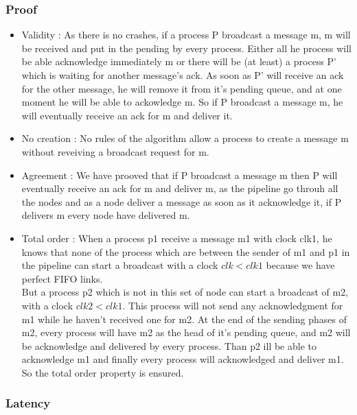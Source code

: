 \documentclass[a4paper]{article}
\begin{document}
\subsubsection{Proof}
\begin{itemize}
    \item Validity : As there  is no crashes, if a process P broadcast a
        message m, m will be received and put in the pending by every
        process. Either all he process will be able acknowledge immediately m 
        or there will be (at least) a process P' which is waiting for another message's ack.
        As soon as P' will receive an ack for the other message, he will remove it from it's
        pending queue, and at one moment he will be able to ackowledge m. 
        So if P broadcast a message m, he will eventually receive an ack
        for m and deliver it.
    \item No creation : No rules of the algorithm allow a process to
        create a message m without reveiving a broadcast request for m.
    \item Agreement : We have prooved that if P broadcast a message m
        then P will eventually receive an ack for m and deliver m, as
        the pipeline go throuh all the nodes and as a node deliver a
        message as soon as it acknowledge it, if P delivers m every node
        have delivered m.
    \item Total order : When a process p1 receive a message m1 with
        clock clk1, he knows
        that none of the process which are between the sender of m1 and p1
        in the pipeline can start a broadcast with a clock $clk<clk1$
        because we have perfect FIFO links.\\
        But a process p2 which is not in this set of node can start a
        broadcast of m2, with a clock $clk2<clk1$. This process will not send
        any acknowledgment for m1 while he haven't received one for m2.
        At the end of the sending phases of m2, every process will have
        m2 as the head of it's pending queue, and m2 will be acknowledge
        and delivered by every process. Than p2 ill be able to
        acknowledge m1 and finally every process will acknowledged and
        deliver m1. So the total order property is ensured.
\end{itemize}
\label{sec:pipelineack-proof}


\subsubsection*{Latency}
\end{document}
